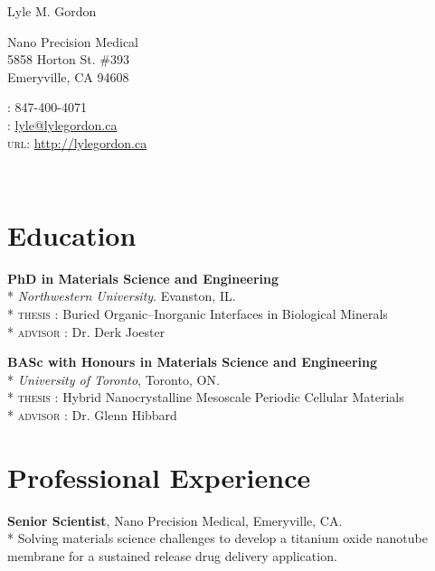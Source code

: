 \setlength\parindent{0cm}
{\LARGE Lyle M. Gordon}\\[0.5cm]

\noindent\begin{minipage}[t]{0.6\textwidth}
Nano Precision Medical\\
5858 Horton St. \#393\\
Emeryville, CA 94608\\
\end{minipage}%
\hfill
\begin{minipage}[t]{0.4\textwidth}
\Telefon: 847-400-4071\\
\Letter: \href{mailto:lyle@lylegordon.ca}{lyle@lylegordon.ca}\\
\textsc{url}: \href{http://lylegordon.ca}{http://lylegordon.ca}
\end{minipage}\\[-2mm]


\section*{Education}
\textbf{PhD in Materials Science and Engineering}\\*
\begingroup\setlength{\parskip}{0.2cm}
\emph{Northwestern University}. Evanston, IL.\\*
\textsc{thesis} : Buried Organic--Inorganic Interfaces in Biological Minerals\\*
\textsc{advisor} : Dr. Derk Joester

\textbf{BASc with Honours in Materials Science and Engineering}\\*
\emph{University of Toronto}, Toronto, ON.\\*
\textsc{thesis} : Hybrid Nanocrystalline Mesoscale Periodic Cellular Materials\\*
\textsc{advisor} : Dr. Glenn Hibbard
\endgroup

\section*{Professional Experience}
\textbf{Senior Scientist}, Nano Precision Medical, Emeryville, CA.\\*
\begingroup\setlength{\parskip}{0.2cm}
Solving materials science challenges to develop a titanium oxide nanotube membrane for a sustained release drug delivery application.

